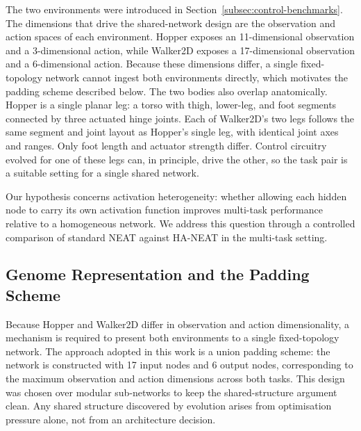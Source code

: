 \documentclass[12pt]{article}
\newcommand{\revGram}[2]{#2}
\begin{document}
The two environments were introduced in Section~\ref{subsec:control-benchmarks}. The dimensions that drive the shared-network design are the observation and action spaces of each environment.
Hopper exposes an 11-dimensional observation and a 3-dimensional action, while Walker2D exposes a 17-dimensional observation and a 6-dimensional action.
Because these dimensions differ, a single fixed-topology network cannot ingest both environments directly, \revGram{G-08}{which motivates the padding scheme described below}.
The two bodies also overlap anatomically.
Hopper is a single planar leg: a torso with thigh, lower-leg, and foot segments connected by three actuated hinge joints.
Each of Walker2D's two legs follows the same segment and joint layout as Hopper's single leg, with identical joint axes and ranges. Only foot length and actuator strength differ.
Control circuitry evolved for one of these legs can, in principle, drive the other, so the task pair is a suitable setting for a single shared network.

Our hypothesis concerns activation heterogeneity: whether allowing each hidden node to carry its own activation function improves multi-task performance relative to a homogeneous network. We address this question through a controlled comparison of standard NEAT against HA-NEAT in the multi-task setting.


\subsection{Genome Representation and the Padding Scheme}
\label{subsec:genome-representation-and-the-padding-scheme}

Because Hopper and Walker2D differ in observation and action dimensionality, a mechanism is required to present both environments to a single fixed-topology network.
The approach adopted in this work is a union padding scheme: the network is constructed with 17 input nodes and 6 output nodes, corresponding to the maximum observation and action dimensions across both tasks.
This design was chosen over modular sub-networks to keep the shared-structure argument clean. Any shared structure discovered by evolution arises from optimisation pressure alone, not from an architecture decision.
\end{document}
